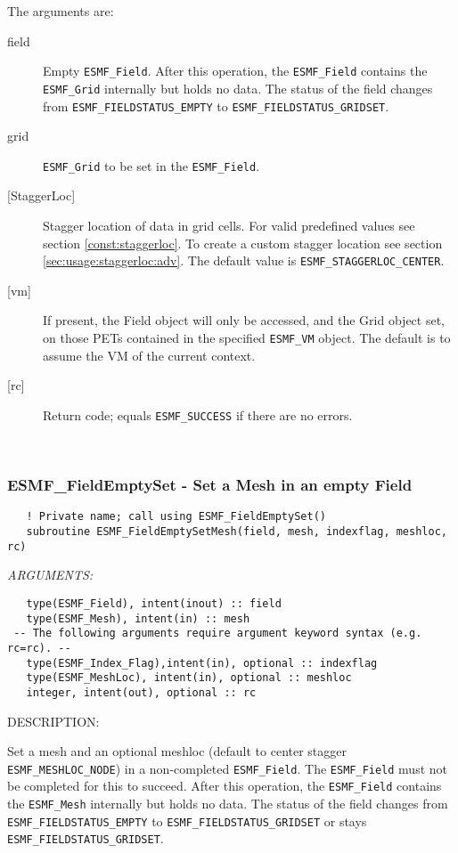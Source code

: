   
   The arguments are:
   \begin{description}
   \item [field]
   Empty {\tt ESMF\_Field}. After this
   operation, the {\tt ESMF\_Field} contains
   the {\tt ESMF\_Grid} internally but holds no data.
   The status of the field changes from
   {\tt ESMF\_FIELDSTATUS\_EMPTY} to {\tt ESMF\_FIELDSTATUS\_GRIDSET}.
   \item [grid]
   {\tt ESMF\_Grid} to be set in the {\tt ESMF\_Field}.
   \item [{[StaggerLoc]}]
   Stagger location of data in grid cells. For valid
   predefined values see section \ref{const:staggerloc}.
   To create a custom stagger location see section
   \ref{sec:usage:staggerloc:adv}. The default
   value is {\tt ESMF\_STAGGERLOC\_CENTER}.
   \item[{[vm]}]
   If present, the Field object will only be accessed, and the Grid object
   set, on those PETs contained in the specified {\tt ESMF\_VM} object.
   The default is to assume the VM of the current context.
   \item [{[rc]}]
   Return code; equals {\tt ESMF\_SUCCESS} if there are no errors.
   \end{description}
   
 
\mbox{}\hrulefill\ 
 
\subsubsection [ESMF\_FieldEmptySet] {ESMF\_FieldEmptySet - Set a Mesh in an empty Field}


\begin{verbatim}   ! Private name; call using ESMF_FieldEmptySet()
   subroutine ESMF_FieldEmptySetMesh(field, mesh, indexflag, meshloc, rc)\end{verbatim}{\em ARGUMENTS:}
\begin{verbatim}   type(ESMF_Field), intent(inout) :: field
   type(ESMF_Mesh), intent(in) :: mesh
 -- The following arguments require argument keyword syntax (e.g. rc=rc). --
   type(ESMF_Index_Flag),intent(in), optional :: indexflag
   type(ESMF_MeshLoc), intent(in), optional :: meshloc
   integer, intent(out), optional :: rc\end{verbatim}
{\sf DESCRIPTION:\\ }


   \begin{sloppypar}
   Set a mesh and an optional meshloc (default to center stagger
   {\tt ESMF\_MESHLOC\_NODE}) in a non-completed {\tt ESMF\_Field}. The
   {\tt ESMF\_Field} must not be completed for this to succeed. After this
   operation, the {\tt ESMF\_Field} contains
   the {\tt ESMF\_Mesh} internally but holds no data.
   The status of the field changes from
   {\tt ESMF\_FIELDSTATUS\_EMPTY} to {\tt ESMF\_FIELDSTATUS\_GRIDSET} or
   stays {\tt ESMF\_FIELDSTATUS\_GRIDSET}.
  
   \end{sloppypar}
  
